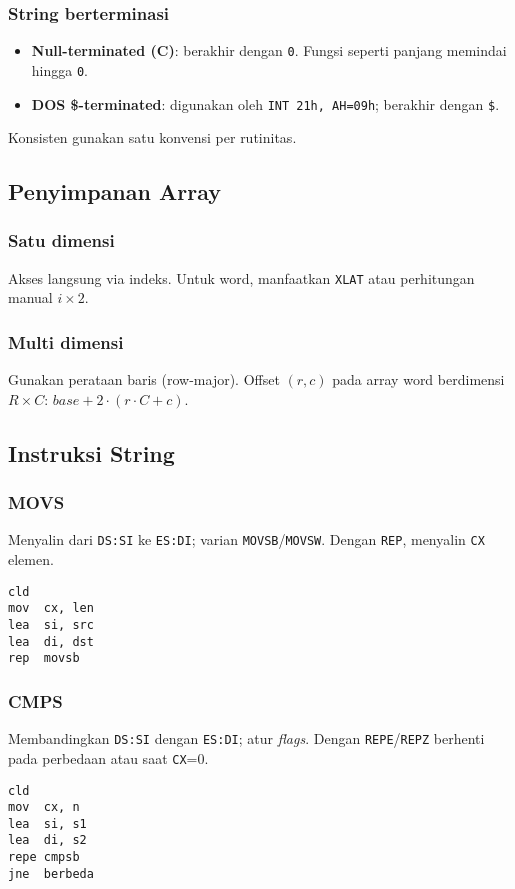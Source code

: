 \subsubsection{String berterminasi}
\begin{itemize}
  \item \textbf{Null-terminated (C)}: berakhir dengan \texttt{0}. Fungsi seperti panjang memindai hingga \texttt{0}.
  \item \textbf{DOS \$-terminated}: digunakan oleh \texttt{INT 21h, AH=09h}; berakhir dengan \texttt{\$}.
\end{itemize}
Konsisten gunakan satu konvensi per rutinitas.

\subsection{Penyimpanan Array}
\subsubsection{Satu dimensi}
Akses langsung via indeks. Untuk word, manfaatkan \texttt{XLAT} atau perhitungan manual \(i\times 2\).

\subsubsection{Multi dimensi}
Gunakan perataan baris (row-major). Offset \((r,c)\) pada array word berdimensi \(R\times C\): \(base + 2\cdot (r\cdot C + c)\).

\subsection{Instruksi String}
\subsubsection{MOVS}
Menyalin dari \texttt{DS:SI} ke \texttt{ES:DI}; varian \texttt{MOVSB}/\texttt{MOVSW}. Dengan \texttt{REP}, menyalin \texttt{CX} elemen.
\begin{verbatim}
cld
mov  cx, len
lea  si, src
lea  di, dst
rep  movsb
\end{verbatim}

\subsubsection{CMPS}
Membandingkan \texttt{DS:SI} dengan \texttt{ES:DI}; atur \textit{flags}. Dengan \texttt{REPE}/\texttt{REPZ} berhenti pada perbedaan atau saat \texttt{CX}=0.
\begin{verbatim}
cld
mov  cx, n
lea  si, s1
lea  di, s2
repe cmpsb
jne  berbeda
\end{verbatim}

